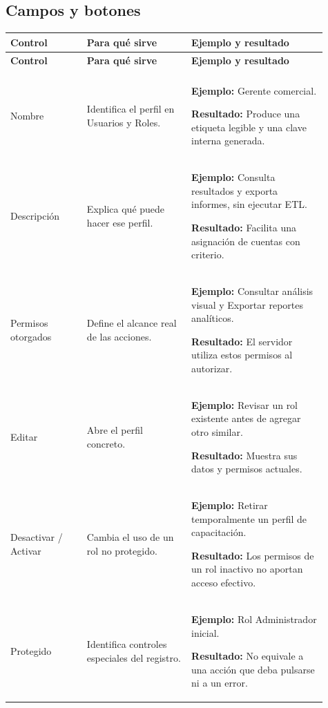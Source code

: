 \subsection{Campos y botones}
\begingroup
\fontsize{10}{12.5}\selectfont
\setlength{\tabcolsep}{5pt}
\renewcommand{\arraystretch}{1.15}
\begin{longtable}{@{}>{\RaggedRight\arraybackslash}p{0.22\linewidth}>{\RaggedRight\arraybackslash}p{0.3\linewidth}>{\RaggedRight\arraybackslash}p{0.39\linewidth}@{}}
\toprule
\textbf{Control} & \textbf{Para qué sirve} & \textbf{Ejemplo y resultado} \\
\midrule
\endfirsthead
\toprule
\textbf{Control} & \textbf{Para qué sirve} & \textbf{Ejemplo y resultado} \\
\midrule
\endhead
\midrule
\multicolumn{3}{r}{\footnotesize Continúa en la página siguiente}\\
\endfoot
\bottomrule
\endlastfoot
Nombre & Identifica el perfil en Usuarios y Roles. & \textbf{Ejemplo:} Gerente comercial.\par\smallskip\textbf{Resultado:} Produce una etiqueta legible y una clave interna generada. \\
\addlinespace[3pt]
Descripción & Explica qué puede hacer ese perfil. & \textbf{Ejemplo:} Consulta resultados y exporta informes, sin ejecutar ETL.\par\smallskip\textbf{Resultado:} Facilita una asignación de cuentas con criterio. \\
\addlinespace[3pt]
Permisos otorgados & Define el alcance real de las acciones. & \textbf{Ejemplo:} Consultar análisis visual y Exportar reportes analíticos.\par\smallskip\textbf{Resultado:} El servidor utiliza estos permisos al autorizar. \\
\addlinespace[3pt]
Editar & Abre el perfil concreto. & \textbf{Ejemplo:} Revisar un rol existente antes de agregar otro similar.\par\smallskip\textbf{Resultado:} Muestra sus datos y permisos actuales. \\
\addlinespace[3pt]
Desactivar / Activar & Cambia el uso de un rol no protegido. & \textbf{Ejemplo:} Retirar temporalmente un perfil de capacitación.\par\smallskip\textbf{Resultado:} Los permisos de un rol inactivo no aportan acceso efectivo. \\
\addlinespace[3pt]
Protegido & Identifica controles especiales del registro. & \textbf{Ejemplo:} Rol Administrador inicial.\par\smallskip\textbf{Resultado:} No equivale a una acción que deba pulsarse ni a un error. \\

\end{longtable}
